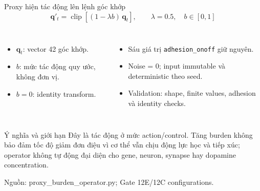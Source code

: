 \documentclass[10pt,aspectratio=169]{beamer}
\newcommand{\source}[1]{\par\vfill{\fontsize{6.0}{7}\selectfont\color{gray}Nguồn: #1\par}}
\begin{document}
\begin{frame}{Proxy hiện tác động lên lệnh góc khớp}
\[
\mathbf{q}'_t = \operatorname{clip}\!\left[(1-\lambda b)\,\mathbf{q}_t\right],
\qquad \lambda=0.5,\quad b\in[0,1]
\]
\begin{columns}[T,onlytextwidth]
\begin{itemize}\setlength\itemsep{7pt}
\item $\mathbf{q}_t$: vector 42 góc khớp.
\item $b$: mức tác động quy ước, không đơn vị.
\item $b=0$: identity transform.
\end{itemize}
\begin{itemize}\setlength\itemsep{7pt}
\item Sáu giá trị \texttt{adhesion\_onoff} giữ nguyên.
\item Noise = 0; input immutable và deterministic theo seed.
\item Validation: shape, finite values, adhesion và identity checks.
\end{itemize}
\end{columns}
\begin{block}{Ý nghĩa và giới hạn}
Đây là tác động ở mức action/control. Tăng burden không bảo đảm tốc độ giảm đơn điệu vì cơ thể vẫn chịu động lực học và tiếp xúc; operator không tự động đại diện cho gene, neuron, synapse hay dopamine concentration.
\end{block}
\source{proxy\_burden\_operator.py; Gate 12E/12C configurations.}
\end{frame}
\end{document}
